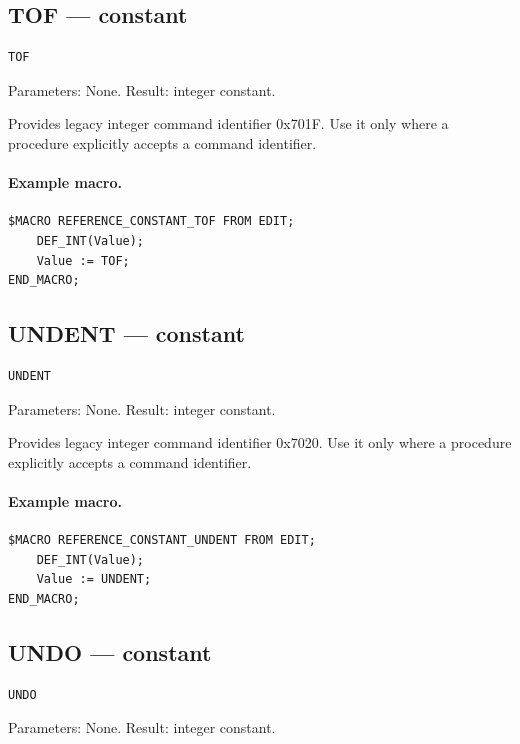 \documentclass[a4paper,10pt,twoside,openany]{book}
\begin{document}
\label{prim:constant-tof}
\subsection*{TOF --- constant}
\begin{verbatim}
TOF
\end{verbatim}
Parameters: None. Result: integer constant.

Provides legacy integer command identifier 0x701F. Use it only where a procedure explicitly accepts a command identifier.

\paragraph{Example macro.}
\begin{verbatim}
$MACRO REFERENCE_CONSTANT_TOF FROM EDIT;
    DEF_INT(Value);
    Value := TOF;
END_MACRO;
\end{verbatim}

\label{prim:constant-undent}
\subsection*{UNDENT --- constant}
\begin{verbatim}
UNDENT
\end{verbatim}
Parameters: None. Result: integer constant.

Provides legacy integer command identifier 0x7020. Use it only where a procedure explicitly accepts a command identifier.

\paragraph{Example macro.}
\begin{verbatim}
$MACRO REFERENCE_CONSTANT_UNDENT FROM EDIT;
    DEF_INT(Value);
    Value := UNDENT;
END_MACRO;
\end{verbatim}

\label{prim:constant-undo}
\subsection*{UNDO --- constant}
\begin{verbatim}
UNDO
\end{verbatim}
Parameters: None. Result: integer constant.
\end{document}
